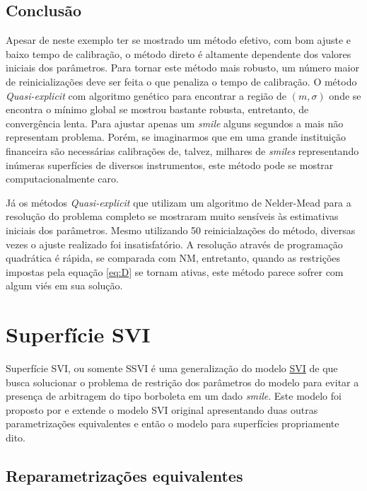 \documentclass[]{book}
\theoremstyle{definition}
\theoremstyle{definition}
\theoremstyle{definition}
\theoremstyle{remark}
\begin{document}
\section{Conclusão}\label{conclusao-3}

Apesar de neste exemplo ter se mostrado um método efetivo, com bom
ajuste e baixo tempo de calibração, o método direto é altamente
dependente dos valores iniciais dos parâmetros. Para tornar este método
mais robusto, um número maior de reinicializações deve ser feita o que
penaliza o tempo de calibração. O método \emph{Quasi-explicit} com
algoritmo genético para encontrar a região de \((m, \sigma)\) onde se
encontra o mínimo global se mostrou bastante robusta, entretanto, de
convergência lenta. Para ajustar apenas um \emph{smile} alguns segundos
a mais não representam problema. Porém, se imaginarmos que em uma grande
instituição financeira são necessárias calibrações de, talvez, milhares
de \emph{smiles} representando inúmeras superfícies de diversos
instrumentos, este método pode se mostrar computacionalmente caro.

Já os métodos \emph{Quasi-explicit} que utilizam um algoritmo de
Nelder-Mead para a resolução do problema completo se mostraram muito
sensíveis às estimativas iniciais dos parâmetros. Mesmo utilizando 50
reinicialzações do método, diversas vezes o ajuste realizado foi
insatisfatório. A resolução através de programação quadrática é rápida,
se comparada com NM, entretanto, quando as restrições impostas pela
equação \eqref{eq:D} se tornam ativas, este método parece sofrer com algum
viés em sua solução.

\chapter{Superfície SVI}\label{ssvi}

Superfície SVI, ou somente SSVI é uma generalização do modelo
\protect\hyperlink{svi}{SVI} de \citep{Gatheral2004} que busca
solucionar o problema de restrição dos parâmetros do modelo para evitar
a presença de arbitragem do tipo borboleta em um dado \emph{smile}. Este
modelo foi proposto por \citep{Gatheral2014} e extende o modelo SVI
original apresentando duas outras parametrizações equivalentes e então o
modelo para superfícies propriamente dito.

\section{Reparametrizações
equivalentes}\label{reparametrizacoes-equivalentes}
\end{document}
